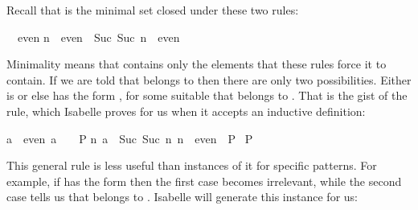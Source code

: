 \begin{isabellebody}
\begin{isamarkuptext}
Recall that  is the minimal set closed under these two rules:
\begin{isabelle}%
{}\ {}\ even\isasep\isanewline%
n\ {}\ even\ {}\ Suc\ {}Suc\ n{}\ {}\ even%
\end{isabelle}
Minimality means that  contains only the elements that these
rules force it to contain.  If we are told that 
belongs to
 then there are only two possibilities.  Either  is 
or else  has the form , for some suitable 
that belongs to
.  That is the gist of the  rule, which Isabelle proves
for us when it accepts an inductive definition:
\begin{isabelle}%
{}a\ {}\ even{}\ a\ {}\ {}\ {}\ P{}\isanewline
{}n{}\ {}a\ {}\ Suc\ {}Suc\ n{}{}\ n\ {}\ even{}\ {}\ P{}\isanewline
{}\ P%
\end{isabelle}
This general rule is less useful than instances of it for
specific patterns.  For example, if  has the form
 then the first case becomes irrelevant, while the second
case tells us that  belongs to .  Isabelle will generate
this instance for us:%
\end{isamarkuptext}%
\isamarkuptrue%
\isamarkupfalse%

\end{isabellebody}
